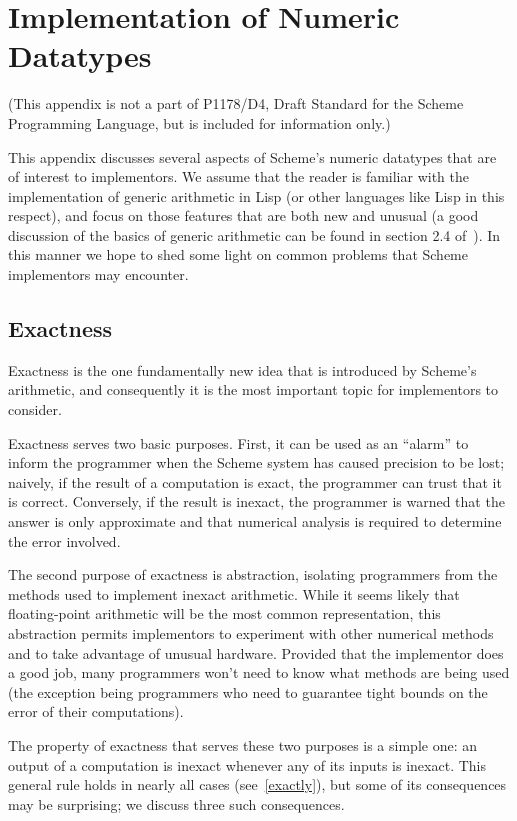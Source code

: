 
\chapter{Implementation of Numeric Datatypes}

(This appendix is not a part of P1178/D4, Draft Standard for the
Scheme Programming Language, but is included for information only.)

This appendix discusses several aspects of Scheme's numeric datatypes
that are of interest to implementors.  We assume that the reader is
familiar with the implementation of generic arithmetic in Lisp (or
other languages like Lisp in this respect), and focus on those
features that are both new and unusual (a good discussion of the
basics of generic arithmetic can be found in section 2.4
of~\cite{SICP}).  In this manner we hope to shed some light on common
problems that Scheme implementors may encounter.

\section{Exactness}

Exactness is the one fundamentally new idea that is introduced by
Scheme's arithmetic, and consequently it is the most important topic
for implementors to consider.

Exactness serves two basic purposes.  First, it can be used as an
``alarm'' to inform the programmer when the Scheme system has caused
precision to be lost; naively, if the result of a computation is
exact, the programmer can trust that it is correct.  Conversely, if
the result is inexact, the programmer is warned that the answer is
only approximate and that numerical analysis is required to determine
the error involved.

The second purpose of exactness is abstraction, isolating programmers
from the methods used to implement inexact arithmetic.  While it seems
likely that floating-point arithmetic will be the most common
representation, this abstraction permits implementors to experiment
with other numerical methods and to take advantage of unusual
hardware.  Provided that the implementor does a good job, many
programmers won't need to know what methods are being used (the
exception being programmers who need to guarantee tight bounds on the
error of their computations).

The property of exactness that serves these two purposes is a simple
one: an output of a computation is inexact whenever any of its inputs
is inexact.  This general rule holds in nearly all cases
(see~\ref{exactly}), but some of its consequences may be surprising;
we discuss three such consequences.

